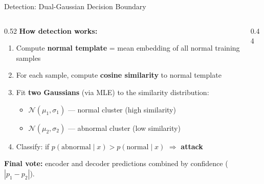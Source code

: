 \documentclass[aspectratio=169]{beamer}
\begin{document}
\begin{frame}{Detection: Dual-Gaussian Decision Boundary}
    \begin{columns}[T]
        \begin{column}{0.52\textwidth}
            \textbf{How detection works:}
            \begin{enumerate}
                \item Compute \textbf{normal template} = mean embedding of all normal training samples
                \item For each sample, compute \textbf{cosine similarity} to normal template
                \item Fit \textbf{two Gaussians} (via MLE) to the similarity distribution:
                \begin{itemize}
                    \item $\mathcal{N}(\mu_1, \sigma_1)$ — normal cluster (high similarity)
                    \item $\mathcal{N}(\mu_2, \sigma_2)$ — abnormal cluster (low similarity)
                \end{itemize}
                \item Classify: if $p(\text{abnormal} \mid x) > p(\text{normal} \mid x)$ $\Rightarrow$ \textbf{attack}
            \end{enumerate}

            \vspace{0.2cm}
            \textbf{Final vote:} encoder and decoder predictions combined by confidence ($|p_1 - p_2|$).
        \end{column}
        \begin{column}{0.44\textwidth}
            \centering
        \end{column}
    \end{columns}
\end{frame}
\end{document}
